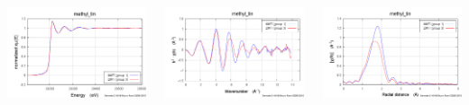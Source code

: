 \documentclass[10pt, xcolor=x11names, compress]{beamer}
\begin{document}
\begin{frame}
\begin{columns}
\begin{column}{0.33\linewidth}
      \includegraphics[width=\linewidth]{../noxtal/images/mtin_mu.png}
    \end{column}
    \begin{column}{0.33\linewidth}
      \includegraphics[width=\linewidth]{../noxtal/images/mtin_chik.png}
    \end{column}
    \begin{column}{0.33\linewidth}
      \includegraphics[width=\linewidth]{../noxtal/images/mtin_chir.png}
    \end{column}
  \end{columns}
\end{frame}
\end{document}
